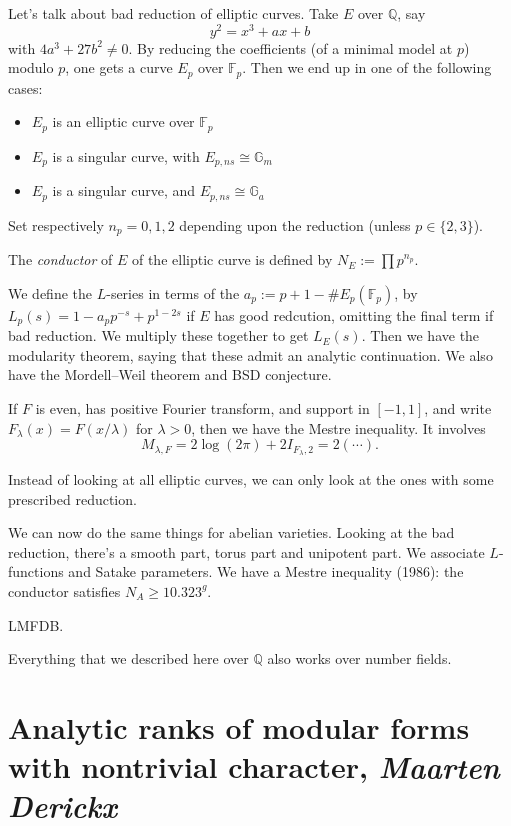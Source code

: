 \documentclass[reqno]{amsart} 
\begin{document}
Let's talk about bad reduction of elliptic curves.  Take $E$ over $\mathbb{Q}$, say
\begin{equation*}
  y^2 = x^3 + a x + b
\end{equation*}
with $4 a^3 + 27 b^2 \neq 0$.  By reducing the coefficients (of a minimal model at $p$) modulo $p$, one gets a curve $E_p$ over $\mathbb{F}_p$.  Then we end up in one of the following cases:
\begin{itemize}
\item $E_p$ is an elliptic curve over $\mathbb{F}_p$
\item $E_p$ is a singular curve, with $E_{p, n s} \cong \mathbb{G}_m$
\item $E_p$ is a singular curve, and $E_{p, ns} \cong \mathbb{G}_a$
\end{itemize}
Set respectively $n_p = 0, 1, 2$ depending upon the reduction (unless $p \in \{2,3\}$).

The \emph{conductor} of $E$ of the elliptic curve is defined by $N_E := \prod p^{n_p}$.

We define the $L$-series in terms of the $a_p := p + 1 - \# E_p(\mathbb{F}_p)$, by $L_p(s) = 1 - a_p p^{- s} + p^{1 - 2 s}$ if $E$ has good redcution, omitting the final term if bad reduction.  We multiply these together to get $L_E(s)$.  Then we have the modularity theorem, saying that these admit an analytic continuation.  We also have the Mordell--Weil theorem and BSD conjecture.

If $F$ is even, has positive Fourier transform, and support in $[-1, 1]$, and write $F_\lambda(x) = F(x / \lambda)$ for $\lambda > 0$, then we have the Mestre inequality.  It involves
\begin{equation*}
  M_{\lambda, F} = 2 \log(2 \pi) + 2 I_{F_\lambda, 2} = 2 \left( \dotsb \right).
\end{equation*}

Instead of looking at all elliptic curves, we can only look at the ones with some prescribed reduction.

We can now do the same things for abelian varieties.  Looking at the bad reduction, there's a smooth part, torus part and unipotent part.  We associate $L$-functions and Satake parameters.  We have a Mestre inequality (1986): the conductor satisfies $N_A \geq 10.323^g$.

LMFDB.

Everything that we described here over $\mathbb{Q}$ also works over number fields.

\section{Analytic ranks of modular forms with nontrivial character, \textnormal{\emph{Maarten Derickx}}}
\end{document}
